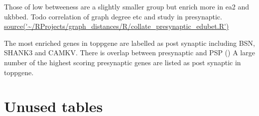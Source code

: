 Those of low betweeness are a slightly smaller group but enrich more in ea2 and ukbbed. Todo correlation of graph degree etc and study in presynaptic. \url{source('~/RProjects/graph_distances/R/collate_presynaptic_edubet.R')}
 

The most enriched genes in toppgene are labelled as post synaptic including BSN, SHANK3 and CAMKV. There is overlap between presynaptic and PSP () A large number of the highest scoring presynaptic genes are listed as post synaptic in toppgene. 





\section{Unused tables}

